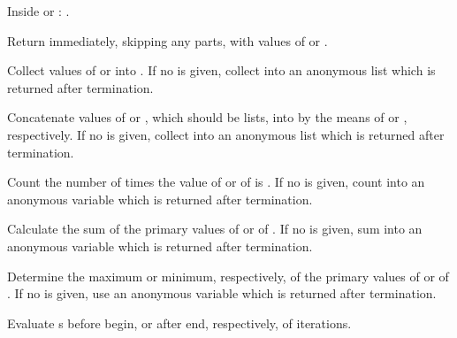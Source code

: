\begin{LIST}{1cm}
\begin{LIST}{.5cm}
    \begin{LIST}{.5cm}
      {
        Inside  or :
        .
      }
    \end{LIST}

    {
    Return immediately, skipping any  parts, with values of  or .
    }

    {
    Collect values of  or  into . If no
     is given, collect into an anonymous list which is
    returned after termination. 
    }

    {
    Concatenate values of  or , which should be
    lists, into  by the means of  or ,
    respectively.  If no  is given, collect into an
    anonymous list which is returned after termination. 
    }

    {
    Count the number of times the value of  or of  is \T.
    If no  is given, count into an anonymous variable
    which is returned after termination.
    }

    {
    Calculate the sum of the primary values of  or of .
    If no  is given, sum into an anonymous variable
    which is returned after termination.
    }

    {
    Determine the maximum or minimum, respectively, of the primary values of
     or of . 
    If no  is given, use an anonymous variable
    which is returned after termination.
    }

    {
    Evaluate s before begin, or after end, respectively, of iterations.
    }


\end{LIST}
\end{LIST}
